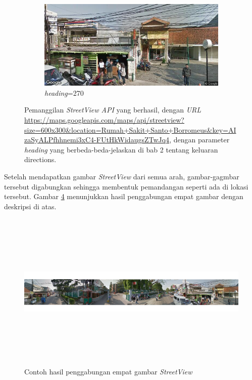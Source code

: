 \begin{figure}[]
\begin{subfigure}{.5\textwidth}
  		\label{fig:streetview180}
	\end{subfigure}
	\begin{subfigure}{.5\textwidth}
  		\centering
  		\includegraphics[width=1\linewidth]{Gambar/streetview270.png}
  		\caption{\textit{heading}=270}
  		\label{fig:streetview270}
	\end{subfigure}
	\caption{Pemanggilan \textit{StreetView API} yang berhasil, dengan \textit{URL} \url{https://maps.googleapis.com/maps/api/streetview?size=600x300&location=Rumah+Sakit+Santo+Borromeus&key=AIzaSyALPfhhnemi3xC4-FUtHkWidaugsZTwJq4}, dengan parameter \textit{heading} yang berbeda-beda-jelaskan di bab 2 tentang keluaran directions.}
\label{fig:comp-streetview}
\end{figure}

Setelah mendapatkan gambar \textit{StreetView} dari semua arah, gambar-gagmbar tersebut digabungkan sehingga membentuk pemandangan seperti ada di lokasi tersebut. Gambar \ref{fig:streetview-vr} menunjukkan hasil penggabungan empat gambar dengan deskripsi di atas.

\begin{figure}[h]
	\centering
		\includegraphics[width=6.5in,height=3in]{Gambar/connected_streetview.png}
	\caption{Contoh hasil penggabungan empat gambar \textit{StreetView}}
	\label{fig:streetview-vr}
\end{figure}

